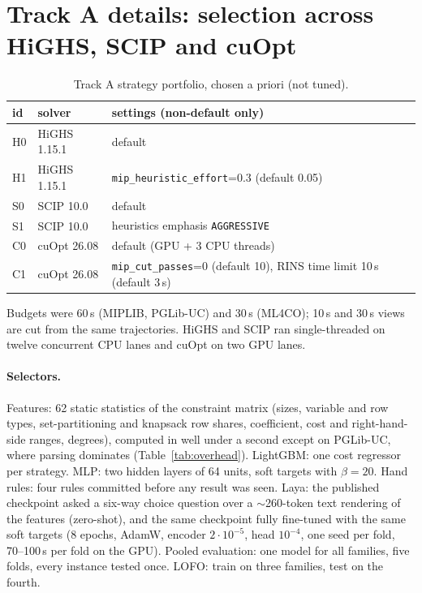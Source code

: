 \section{Track A details: selection across HiGHS, SCIP and cuOpt}\label{app:trackA}
\begin{table}[h]
\centering\small
\begin{tabular}{lll}
\toprule
id & solver & settings (non-default only) \\
\midrule
H0 & HiGHS 1.15.1 & default \\
H1 & HiGHS 1.15.1 & \texttt{mip\_heuristic\_effort}=0.3 (default 0.05) \\
S0 & SCIP 10.0 & default \\
S1 & SCIP 10.0 & heuristics emphasis \texttt{AGGRESSIVE} \\
C0 & cuOpt 26.08 & default (GPU + 3 CPU threads) \\
C1 & cuOpt 26.08 & \texttt{mip\_cut\_passes}=0 (default 10), RINS time limit 10\,s (default 3\,s) \\
\bottomrule
\end{tabular}
\caption{Track A strategy portfolio, chosen a priori (not tuned).}\label{tab:portfolio}
\end{table}
Budgets were 60\,s (MIPLIB, PGLib-UC) and 30\,s (ML4CO); 10\,s and 30\,s views are cut from the same trajectories.
HiGHS and SCIP ran single-threaded on twelve concurrent CPU lanes and cuOpt on two GPU lanes.




\paragraph{Selectors.} Features: 62 static statistics of the constraint matrix (sizes, variable and row types,
set-partitioning and knapsack row shares, coefficient, cost and right-hand-side ranges, degrees), computed in
well under a second except on PGLib-UC, where parsing dominates (Table~\ref{tab:overhead}). LightGBM: one cost
regressor per strategy. MLP: two hidden layers of 64 units, soft targets with $\beta=20$. Hand rules: four rules
committed before any result was seen. Laya: the published checkpoint asked a six-way choice question over a
$\sim$260-token text rendering of the features (zero-shot), and the same checkpoint fully fine-tuned with the same
soft targets (8 epochs, AdamW, encoder $2\cdot10^{-5}$, head $10^{-4}$, one seed per fold, 70--100\,s per fold on the GPU).
Pooled evaluation: one model for all families, five folds, every instance tested once. LOFO: train on three families,
test on the fourth.







